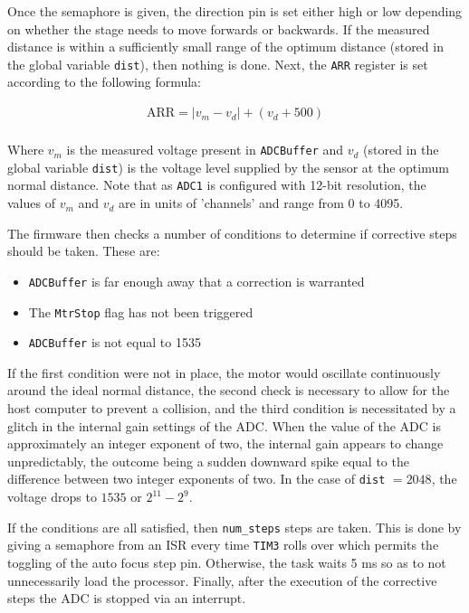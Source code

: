 Once the semaphore is given, the direction pin is set either high or low depending on whether the stage needs to move forwards or backwards. If the measured distance is within a sufficiently small range of the optimum distance (stored in the global variable \verb|dist|), then nothing is done. Next, the \verb|ARR| register is set according to the following formula:

\begin{gather*}
    \text{ARR} = |v_m - v_d| + (v_d + 500)\\
\end{gather*}

Where $v_m$ is the measured voltage present in \verb|ADCBuffer| and $v_d$ (stored in the global variable \verb|dist|) is the voltage level supplied by the sensor at the optimum normal distance. Note that as \verb|ADC1| is configured with 12-bit resolution, the values of $v_m$ and $v_d$ are in units of 'channels' and range from 0 to 4095.

The firmware then checks a number of conditions to determine if corrective steps should be taken. These are:

\begin{itemize}

    \item \verb|ADCBuffer| is far enough away that a correction is warranted
    
    \item The \verb|MtrStop| flag has not been triggered
    
    \item \verb|ADCBuffer| is not equal to 1535
    
\end{itemize}

If the first condition were not in place, the motor would oscillate continuously around the ideal normal distance, the second check is necessary to allow for the host computer to prevent a collision, and the third condition is necessitated by a glitch in the internal gain settings of the ADC. When the value of the ADC is approximately an integer exponent of two, the internal gain appears to change unpredictably, the outcome being a sudden downward spike equal to the difference between two integer exponents of two. In the case of \verb|dist| $= 2048$, the voltage drops to $1535$ or $2^{11} - 2^9$.

If the conditions are all satisfied, then \verb|num_steps| steps are taken. This is done by giving a semaphore from an ISR every time \verb|TIM3| rolls over which permits the toggling of the auto focus step pin. Otherwise, the task waits 5 ms so as to not unnecessarily load the processor. Finally, after the execution of the corrective steps the ADC is stopped via an interrupt.



